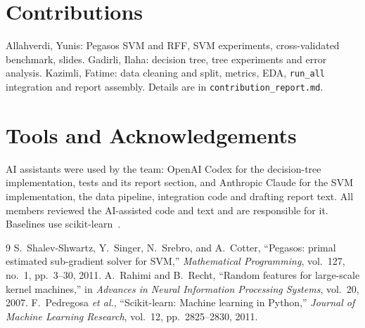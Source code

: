 \documentclass[10pt,twocolumn,a4paper]{article}
\begin{document}
\section*{Contributions}
Allahverdi, Yunis: Pegasos SVM and RFF, SVM experiments, cross-validated
benchmark, slides. Gadirli, Ilaha: decision tree, tree experiments and
error analysis. Kazimli, Fatime: data cleaning and split, metrics, EDA,
\texttt{run\_all} integration and report assembly. Details are in
\texttt{contribution\_report.md}.

\section*{Tools and Acknowledgements}
AI assistants were used by the team: OpenAI Codex for the decision-tree
implementation, tests and its report section, and Anthropic Claude for the
SVM implementation, the data pipeline, integration code and drafting
report text. All members reviewed the AI-assisted code and text and are
responsible for it. Baselines use scikit-learn~\cite{sklearn}.

\begin{thebibliography}{9}
S.~Shalev-Shwartz, Y.~Singer, N.~Srebro, and A.~Cotter,
``Pegasos: primal estimated sub-gradient solver for SVM,''
\emph{Mathematical Programming}, vol.~127, no.~1, pp.~3--30, 2011.
A.~Rahimi and B.~Recht, ``Random features for large-scale kernel machines,''
in \emph{Advances in Neural Information Processing Systems}, vol.~20, 2007.
F.~Pedregosa \emph{et al.}, ``Scikit-learn: Machine learning in Python,''
\emph{Journal of Machine Learning Research}, vol.~12, pp.~2825--2830, 2011.
\end{thebibliography}
\end{document}
